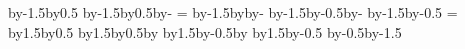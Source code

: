{{    \pgf@anchor@pcbtact@pine\pgfpathcircle{\pgfpoint{\pgf@x}{\pgf@y}}{\pgfutil@tempdima}
    \pgf@anchor@pcbtact@pine\pgfpathcircle{\pgfpoint{\pgf@x}{\pgf@y}}{\pgfutil@tempdimb}
    \pgf@anchor@pcbtact@pinf\pgfpathcircle{\pgfpoint{\pgf@x}{\pgf@y}}{\pgfutil@tempdima}
    \pgf@anchor@pcbtact@pinf\pgfpathcircle{\pgfpoint{\pgf@x}{\pgf@y}}{\pgfutil@tempdimb}
    \color{gray}
    \pgfsetlinewidth{2\pgflinewidth}
    \centerpoint\advance\pgf@x by-1.5\pgfutil@tempdimc\advance\pgf@y by0.5\pgfutil@tempdimd\pgfpathmoveto{\pgfpoint{\pgf@x}{\pgf@y}}
    \centerpoint\advance\pgf@x by-1.5\pgfutil@tempdimc\advance\pgf@y by0.5\pgfutil@tempdimd\advance\pgf@x by-\pgfutil@tempdime\pgfpathlineto{\pgfpoint{\pgf@x}{\pgf@y}}
    \pgfutil@tempdimf=\dipnudge
    \centerpoint\advance\pgf@x by-1.5\pgfutil@tempdimc\advance\pgf@y by\pgfutil@tempdimf\advance\pgf@x by-\pgfutil@tempdime\pgfpathlineto{\pgfpoint{\pgf@x}{\pgf@y}}
    \centerpoint\advance\pgf@x by-1.5\pgfutil@tempdimc\advance\pgf@y by-0.5\pgfutil@tempdimd\advance\pgf@x by-\pgfutil@tempdime\pgfpathlineto{\pgfpoint{\pgf@x}{\pgf@y}}
    \centerpoint\advance\pgf@x by-1.5\pgfutil@tempdimc\advance\pgf@y by-0.5\pgfutil@tempdimd\pgfpathlineto{\pgfpoint{\pgf@x}{\pgf@y}}
    \pgfutil@tempdime=\tactright
    \centerpoint\advance\pgf@x by1.5\pgfutil@tempdimc\advance\pgf@y by0.5\pgfutil@tempdimd\pgfpathmoveto{\pgfpoint{\pgf@x}{\pgf@y}}
    \centerpoint\advance\pgf@x by1.5\pgfutil@tempdimc\advance\pgf@y by0.5\pgfutil@tempdimd\advance\pgf@x by\pgfutil@tempdime\pgfpathlineto{\pgfpoint{\pgf@x}{\pgf@y}}
    \centerpoint\advance\pgf@x by1.5\pgfutil@tempdimc\advance\pgf@y by-0.5\pgfutil@tempdimd\advance\pgf@x by\pgfutil@tempdime\pgfpathlineto{\pgfpoint{\pgf@x}{\pgf@y}}
    \centerpoint\advance\pgf@x by1.5\pgfutil@tempdimc\advance\pgf@y by-0.5\pgfutil@tempdimd\pgfpathlineto{\pgfpoint{\pgf@x}{\pgf@y}}
    \color{black}
    \begingroup
    \tikzset{pcb/part labels} %
    \tikz@textfont
    \centerpoint\advance\pgf@y by-0.5\pgfutil@tempdimd\advance\pgf@y by-1.5\pgfutil@tempdimb
    \endgroup
  }
}
% 
